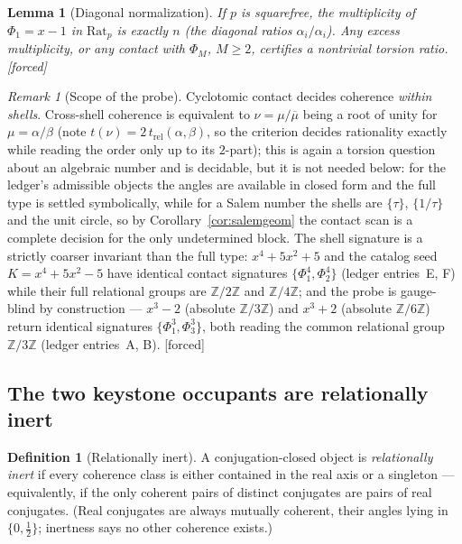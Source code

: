 \documentclass[11pt]{article}
\theoremstyle{plain}
\newtheorem{lemma}[theorem]{Lemma}
\theoremstyle{definition}
\newtheorem{definition}[theorem]{Definition}
\theoremstyle{remark}
\newtheorem{remark}[theorem]{Remark}
\newcommand{\Z}{\mathbb{Z}}
\newcommand{\Rat}{\mathrm{Rat}}
\newcommand{\F}{\textnormal{[forced]}}
\begin{document}
\begin{lemma}[Diagonal normalization]\label{lem:diag}
If $p$ is squarefree, the multiplicity of $\Phi_1=x-1$ in $\Rat_p$ is exactly
$n$ (the diagonal ratios $\alpha_i/\alpha_i$). Any excess multiplicity, or any
contact with $\Phi_M$, $M\ge2$, certifies a nontrivial torsion ratio. \F
\end{lemma}

\begin{remark}[Scope of the probe]\label{rem:scope}
Cyclotomic contact decides coherence \emph{within shells}. Cross-shell
coherence is equivalent to $\nu=\mu/\overline{\mu}$ being a root of unity for
$\mu=\alpha/\beta$ (note $t(\nu)=2\,t_{\mathrm{rel}}(\alpha,\beta)$, so the
criterion decides rationality exactly while reading the order only up to its
$2$-part); this is again a torsion question about an algebraic number and is
decidable, but it is not needed below: for the ledger's admissible objects the
angles are available in closed form and the full type is settled symbolically,
while for a Salem number the shells are $\{\tau\}$, $\{1/\tau\}$ and the unit
circle, so by Corollary~\ref{cor:salemgeom} the contact scan is a complete
decision for the only undetermined block. The shell signature is a strictly
coarser invariant than the full type: $x^4+5x^2+5$ and the catalog seed
$K=x^4+5x^2-5$ have identical contact signatures $\{\Phi_1^4,\Phi_2^4\}$
(ledger entries~E, F) while their full relational groups are $\Z/2\Z$ and
$\Z/4\Z$; and the probe is gauge-blind by construction --- $x^3-2$ (absolute
$\Z/3\Z$) and $x^3+2$ (absolute $\Z/6\Z$) return identical signatures
$\{\Phi_1^3,\Phi_3^3\}$, both reading the common relational group $\Z/3\Z$
(ledger entries~A, B). \F
\end{remark}

\subsection{The two keystone occupants are relationally inert}

\begin{definition}[Relationally inert]\label{def:inert}
A conjugation-closed object is \emph{relationally inert} if every coherence
class is either contained in the real axis or a singleton --- equivalently,
if the only coherent pairs of distinct conjugates are pairs of real
conjugates. (Real conjugates are always mutually coherent, their angles
lying in $\{0,\tfrac12\}$; inertness says no other coherence exists.)
\end{definition}
\end{document}
